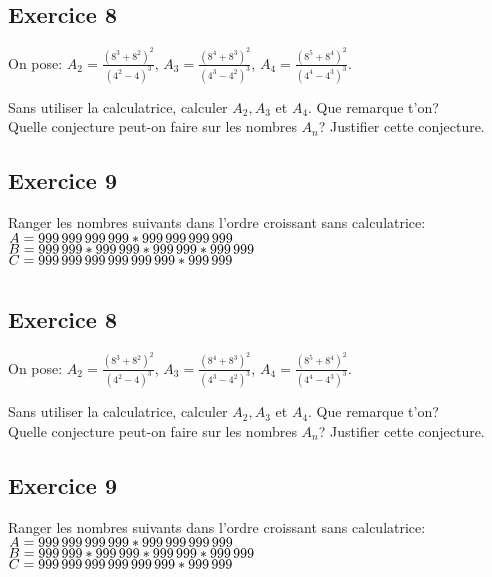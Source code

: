 \documentclass[12pt, twoside]{article}
\begin{document}
\section*{}

\subsection*{Exercice 8}

On pose: $A_2=\frac{(8^{3}+8^{2})^{2}}{(4^{2}-4)^{3}}$, \enskip
$A_3=\frac{(8^{4}+8^{3})^{2}}{(4^{3}-4^{2})^{3}}$, \enskip
$A_4=\frac{(8^{5}+8^{4})^{2}}{(4^{4}-4^{3})^{3}}$.


Sans utiliser la calculatrice, calculer $A_2,A_3$ et $A_4$. Que remarque t'on?\\
Quelle conjecture peut-on faire sur les nombres $A_n$? Justifier cette
conjecture.

\subsection*{Exercice 9}
Ranger les nombres suivants dans l'ordre croissant sans calculatrice:\\
$A=999 \thinspace 999 \thinspace 999 \thinspace 999 * 999 \thinspace 999
\thinspace 999 \thinspace 999$\\
$B= 999 \thinspace 999* 999 \thinspace 999 *999 \thinspace 999 * 999 \thinspace
999$\\
$C=999 \thinspace 999 \thinspace 999 \thinspace 999 \thinspace 999 \thinspace
999 * 999 \thinspace 999$

\section*{}

\subsection*{Exercice 8}

On pose: $A_2=\frac{(8^{3}+8^{2})^{2}}{(4^{2}-4)^{3}}$, \enskip
$A_3=\frac{(8^{4}+8^{3})^{2}}{(4^{3}-4^{2})^{3}}$, \enskip
$A_4=\frac{(8^{5}+8^{4})^{2}}{(4^{4}-4^{3})^{3}}$.


Sans utiliser la calculatrice, calculer $A_2,A_3$ et $A_4$. Que remarque t'on?\\
Quelle conjecture peut-on faire sur les nombres $A_n$? Justifier cette
conjecture.

\subsection*{Exercice 9}
Ranger les nombres suivants dans l'ordre croissant sans calculatrice:\\
$A=999 \thinspace 999 \thinspace 999 \thinspace 999 * 999 \thinspace 999
\thinspace 999 \thinspace 999$\\
$B= 999 \thinspace 999* 999 \thinspace 999 *999 \thinspace 999 * 999 \thinspace
999$\\
$C=999 \thinspace 999 \thinspace 999 \thinspace 999 \thinspace 999 \thinspace
999 * 999 \thinspace 999$
\end{document}
